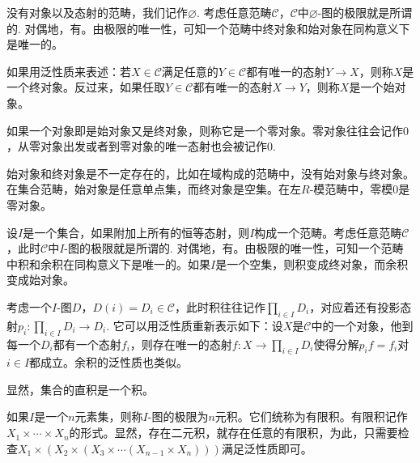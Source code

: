 \begin{para}[终对象与始对象]
没有对象以及态射的范畴，我们记作$\varnothing$. 考虑任意范畴$\mathcal{C}$，$\mathcal{C}$中$\varnothing$-图的极限就是所谓的. 对偶地，有。由极限的唯一性，可知一个范畴中终对象和始对象在同构意义下是唯一的。

如果用泛性质来表述：若$X\in \mathcal{C}$满足任意的$Y\in \mathcal{C}$都有唯一的态射$Y\to X$，则称$X$是一个终对象。反过来，如果任取$Y\in \mathcal{C}$都有唯一的态射$X\to Y$，则称$X$是一个始对象。

如果一个对象即是始对象又是终对象，则称它是一个零对象。零对象往往会记作$0$，从零对象出发或者到零对象的唯一态射也会被记作$0$.

始对象和终对象是不一定存在的，比如在域构成的范畴中，没有始对象与终对象。在集合范畴，始对象是任意单点集，而终对象是空集。在左$R$-模范畴中，零模$0$是零对象。
\end{para}

\begin{para}[积与余积]
设$I$是一个集合，如果附加上所有的恒等态射，则$I$构成一个范畴。考虑任意范畴$\mathcal{C}$，此时$\mathcal{C}$中$I$-图的极限就是所谓的. 对偶地，有。由极限的唯一性，可知一个范畴中积和余积在同构意义下是唯一的。如果$I$是一个空集，则积变成终对象，而余积变成始对象。

考虑一个$I$-图$D$，$D(i)=D_i\in \mathcal{C}$，此时积往往记作$\prod_{i\in I} D_i$，对应着还有投影态射$p_i:\prod_{i\in I} D_i\to D_i$. 它可以用泛性质重新表示如下：设$X$是$\mathcal{C}$中的一个对象，他到每一个$D_i$都有一个态射$f_i$，则存在唯一的态射$f:X\to \prod_{i\in I} D_i$使得分解$p_if=f_i$对$i\in I$都成立。余积的泛性质也类似。

显然，集合的直积是一个积。

如果$I$是一个$n$元素集，则称$I$-图的极限为$n$元积。它们统称为有限积。有限积记作$X_1\times \cdots \times X_n$的形式。显然，存在二元积，就存在任意的有限积，为此，只需要检查$X_1\times (X_2\times (X_3 \times \cdots (X_{n-1}\times X_n)))$满足泛性质即可。
\end{para}

